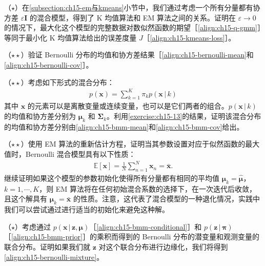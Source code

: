 \documentclass[../../main.tex]{subfiles}
\begin{document}
\begin{exercise}\label{exercise:ch15-12}
（$\star$）在\cref{subsection:ch15-em与kmeans}小节中，我们通过考虑一个所有分量都有协方差 $\varepsilon\bm{I}$ 的混合模型，得到了 K 均值算法和 EM 算法之间的关系。证明在 $\varepsilon\rightarrow0$ 的情况下，最大化这个模型的完整数据对数似然函数的期望［\eqref{align:ch15-q-gmm}］等同于最小化 K 均值算法给出的误差度量 $J$［\eqref{align:ch15-kmeans-loss}］。
\end{exercise}

\begin{exercise}\label{exercise:ch15-13}
（$\star\star$）验证 Bernoulli 分布的均值和协方差结果［\eqref{align:ch15-bernoulli-mean}和\eqref{align:ch15-bernoulli-cov}］。
\end{exercise}

\begin{exercise}\label{exercise:ch15-14}
（$\star\star$）考虑如下形式的混合分布：
\begin{align}
p(\bm{x})=\sum_{k=1}^{K}\pi_k p(\bm{x}\,|\,k)
\label{align:ch15-ex-mixture2}
\end{align}
其中 $\bm{x}$ 的元素可以是离散变量或连续变量，也可以是它们两者的组合。$p(\bm{x}\,|\,k)$ 的均值和协方差分别为 $\bm{\mu}_k$ 和 $\bm{\Sigma}_k$。利用\cref{exercise:ch15-13}的结果，证明该混合分布的均值和协方差分别由\eqref{align:ch15-bmm-mean}和\eqref{align:ch15-bmm-cov}给出。
\end{exercise}

\begin{exercise}\label{exercise:ch15-15}
（$\star\star$）使用 EM 算法的重新估计方程，证明当其参数设置对应于似然函数的最大值时，Bernoulli 混合模型具有以下性质：
\begin{align}
\mathbb{E}[\bm{x}]=\frac{1}{N}\sum_{n=1}^{N}\bm{x}_n=\bar{\bm{x}}.
\label{align:ch15-ex-mean}
\end{align}
继续证明如果这个模型的参数初始化使得所有分量都有相同的平均值 $\bm{\mu}_k=\hat{\bm{\mu}}$，$k=1,\cdots,K$，则 EM 算法将在任何初始混合系数的选择下，在一次迭代后收敛，且这个解具有 $\bm{\mu}_k=\bar{\bm{x}}$ 的性质。注意，这代表了混合模型的一种退化情况，实践中我们可以尝试通过进行适当的初始化来避免这种解。
\end{exercise}

\begin{exercise}\label{exercise:ch15-16}
（$\star$）考虑通过 $p(\bm{x}\,|\,\bm{z},\bm{\mu})$［\eqref{align:ch15-bmm-conditional}］和 $p(\bm{z}\,|\,\bm{\pi})$［\eqref{align:ch15-bmm-prior}］的乘积而得到的 Bernoulli 分布的潜变量和观测变量的联合分布。证明如果我们就 $\bm{z}$ 对这个联合分布进行边缘化，我们将得到\eqref{align:ch15-bernoulli-mixture}。
\end{exercise}
\end{document}
